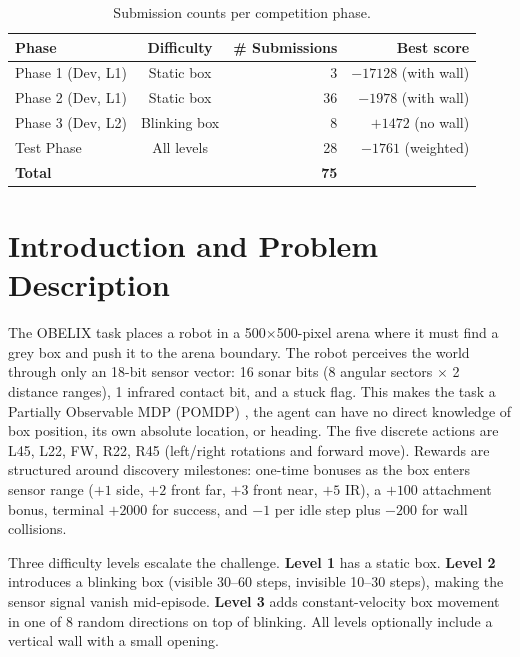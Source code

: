 \documentclass[11pt, oneside]{article}
\begin{document}
\begin{table}[H]\centering\small
\caption{Submission counts per competition phase.}
\begin{tabular}{lcrr}
\toprule
Phase & Difficulty & \# Submissions & Best score \\
\midrule
Phase 1 (Dev, L1) & Static box & 3 & $-17128$ (with wall) \\
Phase 2 (Dev, L1) & Static box & 36 & $-1978$ (with wall) \\
Phase 3 (Dev, L2) & Blinking box & 8 & $+1472$ (no wall) \\
Test Phase & All levels & 28 & $-1761$ (weighted) \\
\midrule
\textbf{Total} & & \textbf{75} & \\
\bottomrule
\end{tabular}
\end{table}

\section{Introduction and Problem Description}

The OBELIX task places a robot in a 500$\times$500-pixel arena where it must find a grey box and push it to the arena boundary. The robot perceives the world through only an 18-bit sensor vector: 16 sonar bits (8 angular sectors $\times$ 2 distance ranges), 1 infrared contact bit, and a stuck flag. This makes the task a Partially Observable MDP (POMDP) \cite{kaelbling1998}, the agent can have no direct knowledge of box position, its own absolute location, or heading. The five discrete actions are L45, L22, FW, R22, R45 (left/right rotations and forward move). Rewards are structured around discovery milestones: one-time bonuses as the box enters sensor range ($+1$ side, $+2$ front far, $+3$ front near, $+5$ IR), a $+100$ attachment bonus, terminal $+2000$ for success, and $-1$ per idle step plus $-200$ for wall collisions.

Three difficulty levels escalate the challenge. \textbf{Level 1} has a static box. \textbf{Level 2} introduces a blinking box (visible 30--60 steps, invisible 10--30 steps), making the sensor signal vanish mid-episode. \textbf{Level 3} adds constant-velocity box movement in one of 8 random directions on top of blinking. All levels optionally include a vertical wall with a small opening.
\end{document}
